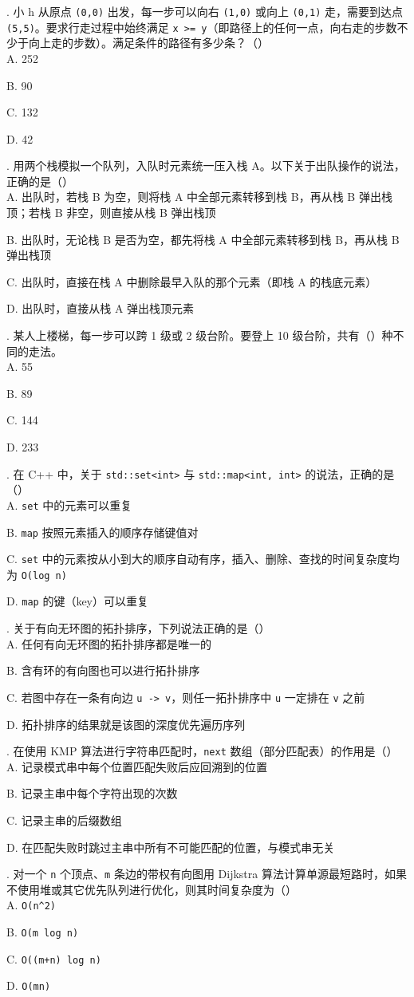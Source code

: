 \documentclass[a4paper]{ctexart}
\newcommand{\q}[1]{\noindent #1}
\newcommand{\opt}[1]{\hspace*{2em} #1\par}
\begin{document}
\q{4.} 小 h 从原点 \texttt{(0,0)} 出发，每一步可以向右 \texttt{(1,0)} 或向上 \texttt{(0,1)} 走，需要到达点 \texttt{(5,5)}。要求行走过程中始终满足 \texttt{x >= y}（即路径上的任何一点，向右走的步数不少于向上走的步数）。满足条件的路径有多少条？（\qquad）\\
\opt{A. 252}
\opt{B. 90}
\opt{C. 132}
\opt{D. 42}

\q{5.} 用两个栈模拟一个队列，入队时元素统一压入栈 A。以下关于出队操作的说法，正确的是（\qquad）\\
\opt{A. 出队时，若栈 B 为空，则将栈 A 中全部元素转移到栈 B，再从栈 B 弹出栈顶；若栈 B 非空，则直接从栈 B 弹出栈顶}
\opt{B. 出队时，无论栈 B 是否为空，都先将栈 A 中全部元素转移到栈 B，再从栈 B 弹出栈顶}
\opt{C. 出队时，直接在栈 A 中删除最早入队的那个元素（即栈 A 的栈底元素）}
\opt{D. 出队时，直接从栈 A 弹出栈顶元素}

\q{6.} 某人上楼梯，每一步可以跨 1 级或 2 级台阶。要登上 10 级台阶，共有（\qquad）种不同的走法。\\
\opt{A. 55}
\opt{B. 89}
\opt{C. 144}
\opt{D. 233}

\q{7.} 在 C++ 中，关于 \texttt{std::set<int>} 与 \texttt{std::map<int, int>} 的说法，正确的是（\qquad）\\
\opt{A. \texttt{set} 中的元素可以重复}
\opt{B. \texttt{map} 按照元素插入的顺序存储键值对}
\opt{C. \texttt{set} 中的元素按从小到大的顺序自动有序，插入、删除、查找的时间复杂度均为 \texttt{O(log n)}}
\opt{D. \texttt{map} 的键（key）可以重复}

\q{8.} 关于有向无环图的拓扑排序，下列说法正确的是（\qquad）\\
\opt{A. 任何有向无环图的拓扑排序都是唯一的}
\opt{B. 含有环的有向图也可以进行拓扑排序}
\opt{C. 若图中存在一条有向边 \texttt{u -> v}，则任一拓扑排序中 \texttt{u} 一定排在 \texttt{v} 之前}
\opt{D. 拓扑排序的结果就是该图的深度优先遍历序列}

\q{9.} 在使用 KMP 算法进行字符串匹配时，\texttt{next} 数组（部分匹配表）的作用是（\qquad）\\
\opt{A. 记录模式串中每个位置匹配失败后应回溯到的位置}
\opt{B. 记录主串中每个字符出现的次数}
\opt{C. 记录主串的后缀数组}
\opt{D. 在匹配失败时跳过主串中所有不可能匹配的位置，与模式串无关}

\q{10.} 对一个 \texttt{n} 个顶点、\texttt{m} 条边的带权有向图用 Dijkstra 算法计算单源最短路时，如果不使用堆或其它优先队列进行优化，则其时间复杂度为（\qquad）\\
\opt{A. \texttt{O(n\^{}2)}}
\opt{B. \texttt{O(m log n)}}
\opt{C. \texttt{O((m+n) log n)}}
\opt{D. \texttt{O(mn)}}
\end{document}
